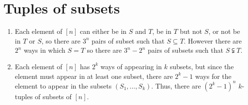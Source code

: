 \documentclass{article}
\begin{document}
\section{Tuples of subsets}
   \begin{enumerate}
      \item Each element of $[n]$ can either be in $S$ and $T$,
         be in $T$ but not $S$, or not be in $T$ or $S$, so
         there are $3^n$  pairs of subset such that $S \subseteq T$.
         However there are $2^n$ ways in which $S=T$ so there are $3^n - 2^n$
         pairs of subsets such that $S \subsetneqq T$.
      \item Each element of $[n]$ has $2^k$ ways of appearing in $k$ subsets,
         but since the element must appear in at least one subset, there are $2^k-1$ ways 
         for the element to appear in the subsets $(S_1,\hdots,S_k)$.
         Thus, there are $(2^k-1)^n$ $k$-tuples of subsets of $[n]$.

   \end{enumerate}
      
\end{document}
